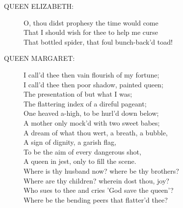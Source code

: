 \documentclass{article}
\begin{document}
\begin{description}
\item[QUEEN ELIZABETH:] 
\hspace{1pt}O, thou didst prophesy the time would come\\
\hspace{1pt}That I should wish for thee to help me curse\\
\hspace{1pt}That bottled spider, that foul bunch-back'd toad!\\
\end{description}
\begin{description}
\item[QUEEN MARGARET:] 
\hspace{1pt}I call'd thee then vain flourish of my fortune;\\
\hspace{1pt}I call'd thee then poor shadow, painted queen;\\
\hspace{1pt}The presentation of but what I was;\\
\hspace{1pt}The flattering index of a direful pageant;\\
\hspace{1pt}One heaved a-high, to be hurl'd down below;\\
\hspace{1pt}A mother only mock'd with two sweet babes;\\
\hspace{1pt}A dream of what thou wert, a breath, a bubble,\\
\hspace{1pt}A sign of dignity, a garish flag,\\
\hspace{1pt}To be the aim of every dangerous shot,\\
\hspace{1pt}A queen in jest, only to fill the scene.\\
\hspace{1pt}Where is thy husband now? where be thy brothers?\\
\hspace{1pt}Where are thy children? wherein dost thou, joy?\\
\hspace{1pt}Who sues to thee and cries 'God save the queen'?\\
\hspace{1pt}Where be the bending peers that flatter'd thee?\\

\end{description}
\end{document}
